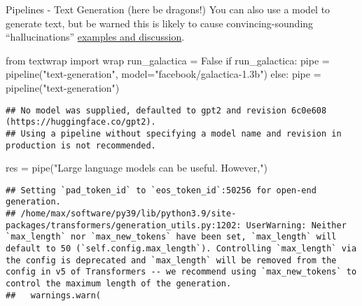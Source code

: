\documentclass[
  10pt,
  ignorenonframetext,
  aspectratio=169]{beamer}
\newenvironment{Shaded}{\begin{snugshade}}{\end{snugshade}}
\newcommand{\ControlFlowTok}[1]{\textcolor[rgb]{0.94,0.87,0.69}{#1}}
\newcommand{\ImportTok}[1]{\textcolor[rgb]{0.80,0.80,0.80}{#1}}
\newcommand{\NormalTok}[1]{\textcolor[rgb]{0.80,0.80,0.80}{#1}}
\newcommand{\OperatorTok}[1]{\textcolor[rgb]{0.94,0.94,0.82}{#1}}
\newcommand{\StringTok}[1]{\textcolor[rgb]{0.80,0.58,0.58}{#1}}
\newcommand{\VariableTok}[1]{\textcolor[rgb]{0.80,0.80,0.80}{#1}}
\begin{document}
\begin{frame}[fragile]{Pipelines - Text Generation (here be dragons!)}
\protect\hypertarget{pipelines---text-generation-here-be-dragons}{}
You can also use a model to generate text, but be warned this is likely
to cause convincing-sounding ``hallucinations''
\href{https://twitter.com/search?q=galactica\&src=typed_query}{examples
and discussion}.

\medskip
\scriptsize

\begin{Shaded}
\begin{Highlighting}[]
\ImportTok{from}\NormalTok{ textwrap }\ImportTok{import}\NormalTok{ wrap}
\NormalTok{run\_galactica }\OperatorTok{=} \VariableTok{False}
\ControlFlowTok{if}\NormalTok{ run\_galactica:}
\NormalTok{    pipe }\OperatorTok{=}\NormalTok{ pipeline(}\StringTok{"text{-}generation"}\NormalTok{, model}\OperatorTok{=}\StringTok{"facebook/galactica{-}1.3b"}\NormalTok{)}
\ControlFlowTok{else}\NormalTok{:}
\NormalTok{    pipe }\OperatorTok{=}\NormalTok{ pipeline(}\StringTok{"text{-}generation"}\NormalTok{)}
    
\end{Highlighting}
\end{Shaded}

\begin{verbatim}
## No model was supplied, defaulted to gpt2 and revision 6c0e608 (https://huggingface.co/gpt2).
## Using a pipeline without specifying a model name and revision in production is not recommended.
\end{verbatim}

\begin{Shaded}
\begin{Highlighting}[]
\NormalTok{res }\OperatorTok{=}\NormalTok{ pipe(}\StringTok{"Large language models can be useful. However,"}\NormalTok{)}
\end{Highlighting}
\end{Shaded}

\begin{verbatim}
## Setting `pad_token_id` to `eos_token_id`:50256 for open-end generation.
## /home/max/software/py39/lib/python3.9/site-packages/transformers/generation_utils.py:1202: UserWarning: Neither `max_length` nor `max_new_tokens` have been set, `max_length` will default to 50 (`self.config.max_length`). Controlling `max_length` via the config is deprecated and `max_length` will be removed from the config in v5 of Transformers -- we recommend using `max_new_tokens` to control the maximum length of the generation.
##   warnings.warn(
\end{verbatim}


\end{frame}
\end{document}
